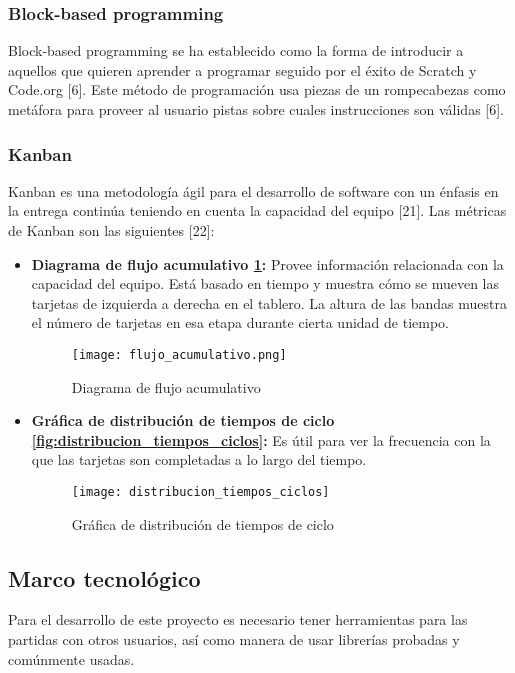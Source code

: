 \subsubsection{Block-based programming}
Block-based programming se ha establecido como la forma de introducir a aquellos que quieren aprender a 
programar seguido por el éxito de Scratch y Code.org [6]. 
Este método de programación usa piezas de un rompecabezas como metáfora para proveer al usuario pistas sobre cuales instrucciones son válidas [6]. 

\subsubsection{Kanban}
Kanban es una metodología ágil para el desarrollo de software con un énfasis 
en la entrega continúa teniendo en cuenta la capacidad del equipo [21]. 
Las métricas de Kanban son las siguientes [22]:
\begin{itemize}
    \item \textbf{Diagrama de flujo acumulativo \ref{fig:flujo_acumulativo}:} Provee información relacionada con la capacidad del equipo. Está basado en tiempo y muestra cómo se mueven las tarjetas de izquierda a derecha en el tablero. La altura de las bandas muestra el número de tarjetas en esa etapa durante cierta unidad de tiempo.
    \begin{figure}[h]
        \caption{Diagrama de flujo acumulativo}
        \centering
        \texttt{[image: flujo\_acumulativo.png]}
        \label{fig:flujo_acumulativo}
    \end{figure}
    \item \textbf{Gráfica de distribución de tiempos de ciclo \ref{fig:distribucion_tiempos_ciclos}:} Es útil para ver la frecuencia con la que las tarjetas son completadas a lo largo del tiempo.
    \begin{figure}[h]
        \caption{Gráfica de distribución de tiempos de ciclo}
        \centering
        \texttt{[image: distribucion\_tiempos\_ciclos]}
    \end{figure}
\end{itemize}

\subsection{Marco tecnológico}
Para el desarrollo de este proyecto es necesario tener herramientas para las partidas con otros usuarios, así como manera de usar librerías probadas y comúnmente usadas.


